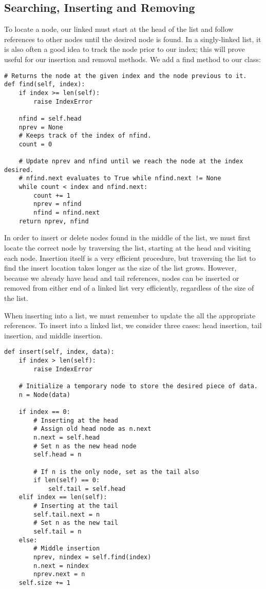 \subsection*{Searching, Inserting and Removing}
To locate a node, our linked must start at the head of the list and follow references to other nodes until the desired node is found.
In a singly-linked list, it is also often a good idea to track the node prior to our index; this will prove useful for our insertion and removal methods.
We add a find method to our  class:
\begin{lstlisting}
# Returns the node at the given index and the node previous to it.
def find(self, index):
    if index >= len(self):
        raise IndexError

    nfind = self.head
    nprev = None
    # Keeps track of the index of nfind.
    count = 0

    # Update nprev and nfind until we reach the node at the index desired.
    # nfind.next evaluates to True while nfind.next != None
    while count < index and nfind.next:
        count += 1
        nprev = nfind
        nfind = nfind.next
    return nprev, nfind
\end{lstlisting}

In order to insert or delete nodes found in the middle of the list, we must first locate the correct node by traversing the list, starting at the head and visiting each node.
Insertion itself is a very efficient procedure, but traversing the list to find the insert location takes longer as the size of the list grows.
However, because we already have head and tail references, nodes can be inserted or removed from either end of a linked list very efficiently, regardless of the size of the list.

When inserting into a list, we must remember to update the all the appropriate references.
To insert into a linked list, we consider three cases: head insertion, tail insertion, and middle insertion.
\begin{lstlisting}
def insert(self, index, data):
    if index > len(self):
        raise IndexError

    # Initialize a temporary node to store the desired piece of data.
    n = Node(data)

    if index == 0:
        # Inserting at the head
        # Assign old head node as n.next
        n.next = self.head
        # Set n as the new head node
        self.head = n

        # If n is the only node, set as the tail also
        if len(self) == 0:
            self.tail = self.head
    elif index == len(self):
        # Inserting at the tail
        self.tail.next = n
        # Set n as the new tail
        self.tail = n
    else:
        # Middle insertion
        nprev, nindex = self.find(index)
        n.next = nindex
        nprev.next = n
    self.size += 1
\end{lstlisting}


